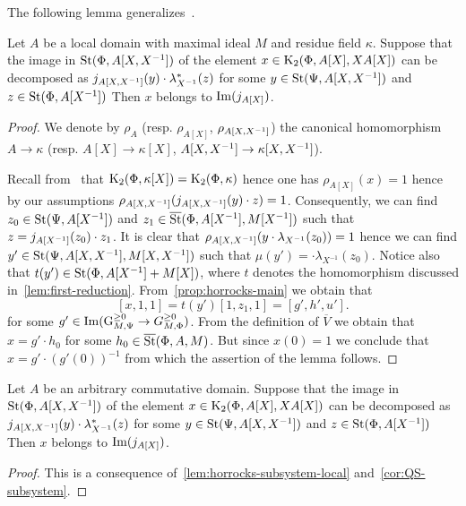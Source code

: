 The following lemma generalizes~\cite[Proposition~4.3(b)]{Tu83}.
\begin{lemma} \label{lem:horrocks-subsystem-local}
Let $A$ be a local domain with maximal ideal $M$ and residue field $\kappa$.
Suppose that the image in $\operatorname{St}(\Phi, A[X, X^{-1}])$ of the element $x \in \operatorname{K}_2(\Phi, A[X], XA[X])$
 can be decomposed as $j_{A[X, X^{-1}]}(y) \cdot \lambda_{X^{-1}}^*(z)$ for
 some $y \in \operatorname{St}(\Psi, A[X, X^{-1}])$ and $z \in \operatorname{St}(\Phi, A[X^{-1}])$
Then $x$ belongs to $\operatorname{Im}(j_{A[X]})$.
\end{lemma}
\begin{proof}
    We denote by $\rho_{A}$ (resp. $\rho_{A[X]}$, $\rho_{A[X, X^{-1}]}$) the canonical homomorphism
     $A \to \kappa$ (resp. $A[X] \to \kappa[X]$, $A[X, X^{-1}] \to \kappa[X, X^{-1}]$).

    Recall from~\cite{Hur77} that $\operatorname{K}_2(\Phi, \kappa[X]) = \operatorname{K}_2(\Phi, \kappa)$ hence one has $\rho_{A[X]}(x) = 1$
     hence by our assumptions $\rho_{A[X, X^{-1}]}(j_{A[X, X^{-1}]}(y) \cdot z) = 1$.
    Consequently, we can find $z_0 \in \operatorname{St}(\Psi, A[X^{-1}])$ and $z_1 \in \overline{\operatorname{St}}(\Phi, A[X^{-1}], M[X^{-1}])$
     such that $z = j_{A[X^{-1}]}(z_0) \cdot z_1$.
    It is clear that $\rho_{A[X, X^{-1}]}(y \cdot \lambda_{X^{-1}}(z_0)) = 1$ hence we can find
     $y' \in \operatorname{St}(\Psi, A[X, X^{-1}], M[X, X^{-1}])$ such that $\mu(y') = \cdot \lambda_{X^{-1}}(z_0)$.
    Notice also that $t(y') \in \operatorname{St}(\Phi, A[X^{-1}] + M[X])$, where $t$ denotes the homomorphism discussed in~\cref{lem:first-reduction}.
    From~\cref{prop:horrocks-main} we obtain that
    \[ [x, 1, 1 ] = t(y') [1, z_1, 1] = [g', h', u']. \]
    for some $g' \in \operatorname{Im}(\operatorname{G}_{M, \Psi}^{\geq 0} \to G_{M, \Phi}^{\geq 0})$.
    From the definition of $\overline{V}$ we obtain that $x = g' \cdot h_0$ for some $h_0 \in \overline{\operatorname{St}}(\Phi, A, M)$.
    But since $x(0) = 1$ we conclude that $x = g' \cdot (g'(0))^{-1}$ from which the assertion of the lemma follows.
\end{proof}

\begin{cor} \label{cor:horrocks--ingredient}
    Let $A$ be an arbitrary commutative domain.
    Suppose that the image in $\operatorname{St}(\Phi, A[X, X^{-1}])$ of the element $x \in \operatorname{K}_2(\Phi, A[X], XA[X])$
    can be decomposed as $j_{A[X, X^{-1}]}(y) \cdot \lambda_{X^{-1}}^*(z)$ for
    some $y \in \operatorname{St}(\Psi, A[X, X^{-1}])$ and $z \in \operatorname{St}(\Phi, A[X^{-1}])$
    Then $x$ belongs to $\operatorname{Im}(j_{A[X]})$.
\end{cor}
\begin{proof}
    This is a consequence of~\cref{lem:horrocks-subsystem-local} and~\cref{cor:QS-subsystem}.
\end{proof}

